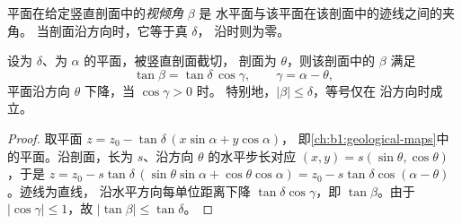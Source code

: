 \begin{definition}[视倾角]\label{def:b1:cross-sections:apparent-dip}
平面在给定竖直剖面中的\emph{视倾角} $\beta$ 是
水平面与该平面在该剖面中的迹线之间的夹角。
当剖面沿方向时，它等于真 $\delta$，
沿时则为零。
\end{definition}

\begin{theorem}[视倾角]\label{thm:b1:cross-sections:apparent-dip}
设为 $\delta$、为 $\alpha$ 的平面，被竖直剖面截切，
剖面为 $\theta$，则该剖面中的 $\beta$ 满足
\[
  \tan\beta = \tan\delta\,\cos\gamma, \qquad \gamma = \alpha - \theta ,
\]
平面沿方向 $\theta$ 下降，当 $\cos\gamma > 0$ 时。
特别地，$|\beta| \le \delta$，等号仅在
沿方向时成立。
\end{theorem}

\begin{proof}
取平面 $z = z_0 - \tan\delta\,(x\sin\alpha + y\cos\alpha)$，
即\cref{ch:b1:geological-maps}中的平面。沿剖面，长为
$s$、沿方向 $\theta$ 的水平步长对应 $(x, y) = s(\sin\theta, \cos\theta)$，于是
$z = z_0 - s\tan\delta\,(\sin\theta\sin\alpha + \cos\theta\cos\alpha) =
z_0 - s\tan\delta\cos(\alpha - \theta)$。迹线为直线，
沿水平方向每单位距离下降 $\tan\delta\cos\gamma$，即
$\tan\beta$。由于 $|\cos\gamma| \le 1$，故 $|\tan\beta| \le \tan\delta$。
\end{proof}


